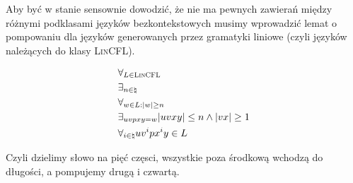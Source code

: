 Aby być w stanie sensownie dowodzić, że nie ma pewnych zawierań między różnymi podklasami języków bezkontekstowych musimy wprowadzić lemat o pompowaniu dla języków generowanych przez gramatyki liniowe (czyli języków należących do klasy \textsc{LinCFL}).

\begin{theorem}
    \large
    \[ 
    \begin{split}
        &\forall_{L \in \textsc{LinCFL}}  \\
        &\exists_{n \in \natural} \\
        &\forall_{w \in L : |w| \geq n} \\
        &\exists_{uvpxy = w} |uvxy| \leq n \land |vx| \geq 1 \\
        &\forall_{i \in \natural} uv^ipx^iy \in L
    \end{split}
     \]
        
\end{theorem}

Czyli dzielimy słowo na pięć częsci, wszystkie poza środkową wchodzą do długości, a pompujemy drugą i czwartą.

